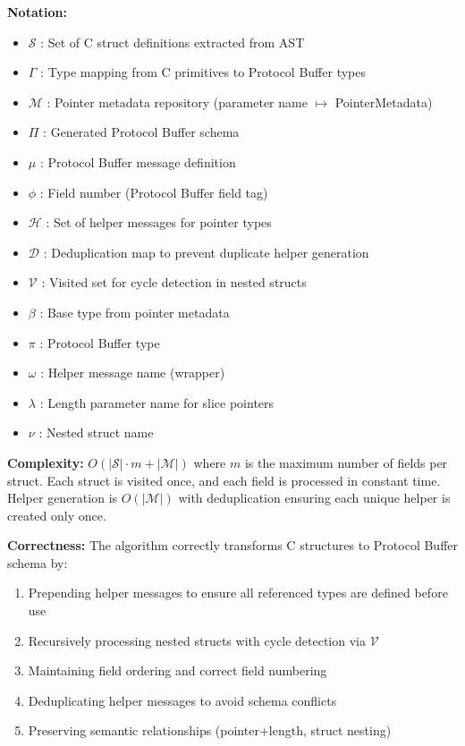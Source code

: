 \vspace{0.5cm}

\textbf{Notation:}
\begin{itemize}
    \item $\mathcal{S}$ : Set of C struct definitions extracted from AST
    \item $\Gamma$ : Type mapping from C primitives to Protocol Buffer types
    \item $\mathcal{M}$ : Pointer metadata repository (parameter name $\mapsto$ PointerMetadata)
    \item $\Pi$ : Generated Protocol Buffer schema
    \item $\mu$ : Protocol Buffer message definition
    \item $\phi$ : Field number (Protocol Buffer field tag)
    \item $\mathcal{H}$ : Set of helper messages for pointer types
    \item $\mathcal{D}$ : Deduplication map to prevent duplicate helper generation
    \item $\mathcal{V}$ : Visited set for cycle detection in nested structs
    \item $\beta$ : Base type from pointer metadata
    \item $\pi$ : Protocol Buffer type
    \item $\omega$ : Helper message name (wrapper)
    \item $\lambda$ : Length parameter name for slice pointers
    \item $\nu$ : Nested struct name
\end{itemize}

\textbf{Complexity:} $O(|\mathcal{S}| \cdot m + |\mathcal{M}|)$ where $m$ is the maximum number of fields per struct. Each struct is visited once, and each field is processed in constant time. Helper generation is $O(|\mathcal{M}|)$ with deduplication ensuring each unique helper is created only once.

\textbf{Correctness:} The algorithm correctly transforms C structures to Protocol Buffer schema by:
\begin{enumerate}
    \item Prepending helper messages to ensure all referenced types are defined before use
    \item Recursively processing nested structs with cycle detection via $\mathcal{V}$
    \item Maintaining field ordering and correct field numbering
    \item Deduplicating helper messages to avoid schema conflicts
    \item Preserving semantic relationships (pointer+length, struct nesting)
\end{enumerate}
